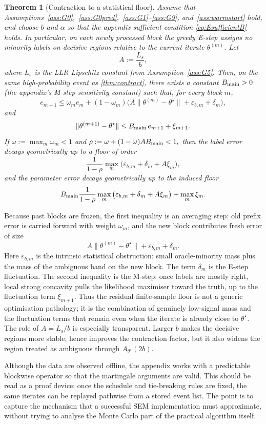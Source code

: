 \documentclass{statsoc}
\newtheorem{theorem}{Theorem}[section]
\newcommand{\1}{\mathbbm{1}}
\begin{document}
\begin{theorem}[Contraction to a statistical floor]\label{thm:sec-contraction}
Assume that Assumptions~\ref{ass:G0},~\ref{ass:G0pred},~\ref{ass:G1}--\ref{ass:G9}, and~\ref{ass:warmstart} hold, and choose \(b\) and \(\alpha\) so that the appendix sufficient condition \eqref{eq:EsufficientB} holds. In particular, on each newly processed block the greedy E-step assigns no minority labels on decisive regions relative to the current iterate \(\theta^{(m)}\). Let
\[
A:=\frac{L_s}{b},
\]
where \(L_s\) is the LLR Lipschitz constant from Assumption~\ref{ass:G5}. Then, on the same high-probability event as \cref{thm:contract}, there exists a constant \(B_{\rm main}>0\) (the appendix's M-step sensitivity constant) such that, for every block \(m\),
\[
e_{m+1}
\le
\omega_m e_m
+
(1-\omega_m)\Big(A\|\theta^{(m)}-\theta^\star\|+\varepsilon_{b,m}+\delta_m\Big),
\]
and
\[
\|\theta^{(m+1)}-\theta^\star\|
\le
B_{\rm main}\,e_{m+1}+\xi_{m+1}.
\]
If \(\omega:=\max_m\omega_m<1\) and
\(
\rho:=\omega+(1-\omega)AB_{\rm main}<1,
\)
then the label error decays geometrically up to a floor of order
\[
\frac{1}{1-\rho}\max_m\big(\varepsilon_{b,m}+\delta_m+A\xi_m\big),
\]
and the parameter error decays geometrically up to the induced floor
\[
B_{\rm main}\frac{1}{1-\rho}\max_m\big(\varepsilon_{b,m}+\delta_m+A\xi_m\big)+\max_m\xi_m.
\]
\end{theorem}

Because past blocks are frozen, the first inequality is an averaging step: old prefix error is carried forward with weight \(\omega_m\), and the new block contributes fresh error of size
\[
A\|\theta^{(m)}-\theta^\star\|+\varepsilon_{b,m}+\delta_m.
\]
Here \(\varepsilon_{b,m}\) is the intrinsic statistical obstruction: small oracle-minority mass plus the mass of the ambiguous band on the new block. The term \(\delta_m\) is the E-step fluctuation. The second inequality is the M-step: once labels are mostly right, local strong concavity pulls the likelihood maximiser toward the truth, up to the fluctuation term \(\xi_{m+1}\). Thus the residual finite-sample floor is not a generic optimisation pathology; it is the combination of genuinely low-signal mass and the fluctuation terms that remain even when the iterate is already close to \(\theta^\star\). The role of \(A=L_s/b\) is especially transparent. Larger \(b\) makes the decisive regions more stable, hence improves the contraction factor, but it also widens the region treated as ambiguous through \(A_{\theta^\star}(2b)\). 

Although the data are observed offline, the appendix works with a predictable blockwise operator so that the martingale arguments are valid. This should be read as a proof device: once the schedule and tie-breaking rules are fixed, the same iterates can be replayed pathwise from a stored event list. The point is to capture the mechanism that a successful SEM implementation must approximate, without trying to analyse the Monte Carlo part of the practical algorithm itself.
\end{document}
